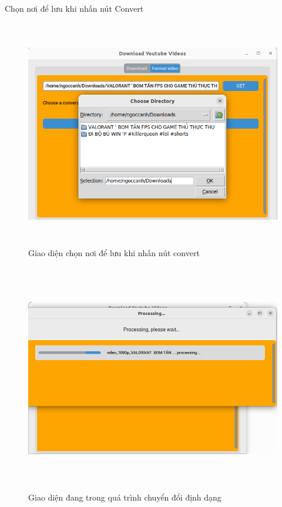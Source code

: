 \documentclass{article} %
\begin{document}
Chọn nơi để lưu khi nhấn nút Convert
\begin{figure}[H]
    \centering
    \includegraphics[width=15cm, height=10cm]{images/tienhanh7.PNG}
    \caption{Giao diện chọn nơi để lưu khi nhấn nút convert}
    \label{fig:enter-label}
\end{figure}
\begin{figure}[H]
    \centering
    \includegraphics[width=15cm, height=10cm]{images/tienhanh8.PNG}
    \caption{Giao diện đang trong quá trình chuyển đổi định dạng}
    \label{fig:enter-label}
\end{figure}
\end{document}

